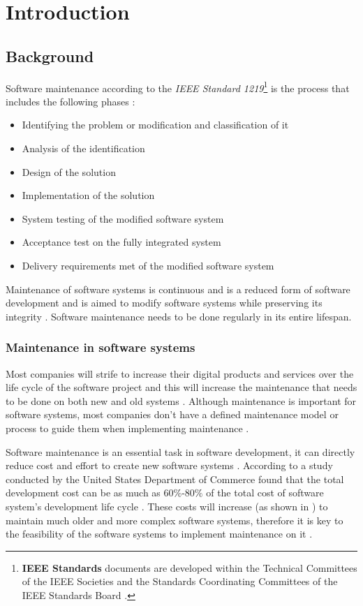 \chapter{Introduction}
\label{chap:1}

\section{Background}\label{section:background}

Software maintenance according to the \textit{IEEE Standard 1219}\footnote{\textbf{IEEE Standards} documents are developed within the Technical Committees of the IEEE Societies and the Standards Coordinating Committees of the IEEE Standards Board \cite{Mamone1994}.} is the process that includes the following phases \cite{Mamone1994, Hasan2012}:
\begin{itemize}
	\item Identifying the problem or modification and classification of it
	\item Analysis of the identification
	\item Design of the solution
	\item Implementation of the solution
	\item System testing of the modified software system
	\item Acceptance test on the fully integrated system
	\item Delivery requirements met of the modified software system
\end{itemize}

Maintenance of software systems is continuous and is a reduced form of software development and is aimed to modify software systems while preserving its integrity \cite{Sneed2004, Ackermann2009}. Software maintenance needs to be done regularly in its entire lifespan. 

\subsection{Maintenance in software systems}
Most companies will strife to increase their digital products and services over the life cycle of the software project and this will increase the maintenance that needs to be done on both new and old systems \cite{Niu2018, Galster2019, Hasan2012}. Although maintenance is important for software systems, most companies don't have a defined maintenance model or process to guide them when implementing maintenance \cite{Stojanov2017}. \par Software maintenance is an essential task in software development, it can directly reduce cost and effort to create new software systems \cite{FrancisThamburaj2017}. According to a study conducted by the United States Department of Commerce found that the total development cost can be as much as $60\%$-$80\%$ of the total cost of software system's development life cycle \cite{Ogheneovo2014, Stark1996, Ackermann2009,Tang2010}. These costs will increase (as shown in ) to maintain much older and more complex software systems, therefore it is key to the feasibility of the software systems to implement maintenance on it \cite{Alenezi2016, Booch1986}.

